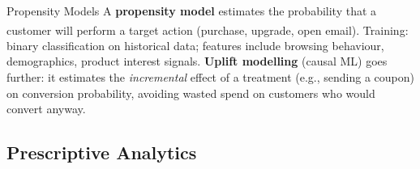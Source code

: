 \begin{v3topic}{Propensity Models}
    A \textbf{propensity model} estimates the probability that a customer will perform a target action (purchase, upgrade, open email)\textsuperscript{\cite[][pp.~162--167]{chaffeyDigitalBusinessECommerce2019}}.
    Training: binary classification on historical data; features include browsing behaviour, demographics, product interest signals.
    \textbf{Uplift modelling} (causal ML) goes further: it estimates the \emph{incremental} effect of a treatment (e.g., sending a coupon) on conversion probability, avoiding wasted spend on customers who would convert anyway.

\end{v3topic}

\subsection{Prescriptive Analytics}


